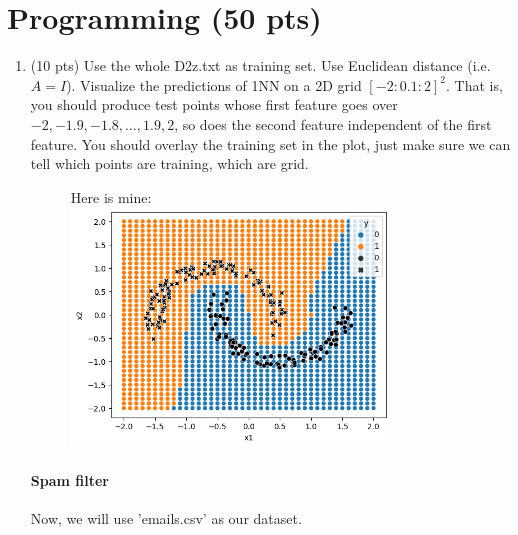 \documentclass[a4paper]{article}
\theoremstyle{definition}
\begin{document}
\section{Programming (50 pts)}
\begin{enumerate}
	\item (10 pts) Use the whole D2z.txt as training set.  Use Euclidean distance (i.e. $A=I$).
	Visualize the predictions of 1NN on a 2D grid $[-2:0.1:2]^2$.
	That is, you should produce test points whose first feature goes over $-2, -1.9, -1.8, \ldots, 1.9, 2$, so does the second feature independent of the first feature.
	You should overlay the training set in the plot, just make sure we can tell which points are training, which are grid.
	
	\begin{figure}[h]
		\centering
            Here is mine:
            \includegraphics[width=0.8\textwidth]{hw3/2_1.png}\\
	\end{figure}
	
	\paragraph{Spam filter} Now, we will use 'emails.csv' as our dataset.
	

\end{enumerate}
\end{document}
